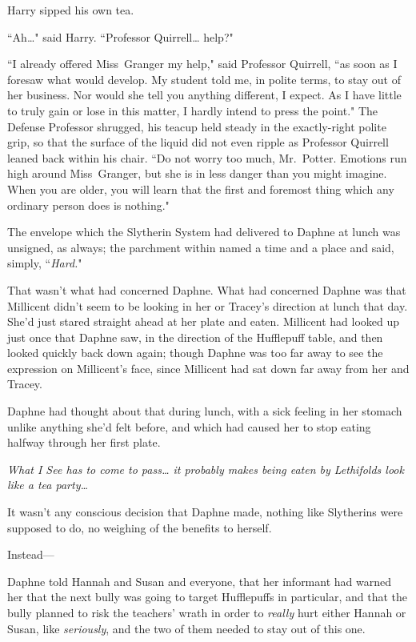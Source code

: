 Harry sipped his own tea.

``Ah{\ldots}" said Harry. ``Professor Quirrell{\ldots} help?"

``I already offered Miss~Granger my help," said Professor Quirrell, ``as soon as I foresaw what would develop. My student told me, in polite terms, to stay out of her business. Nor would she tell you anything different, I expect. As I have little to truly gain or lose in this matter, I hardly intend to press the point." The Defense Professor shrugged, his teacup held steady in the exactly-right polite grip, so that the surface of the liquid did not even ripple as Professor Quirrell leaned back within his chair. ``Do not worry too much, Mr.~Potter. Emotions run high around Miss~Granger, but she is in less danger than you might imagine. When you are older, you will learn that the first and foremost thing which any ordinary person does is nothing."

\later

The envelope which the Slytherin System had delivered to Daphne at lunch was unsigned, as always; the parchment within named a time and a place and said, simply, ``\emph{Hard.}"

That wasn't what had concerned Daphne. What had concerned Daphne was that Millicent didn't seem to be looking in her or Tracey's direction at lunch that day. She'd just stared straight ahead at her plate and eaten. Millicent had looked up just once that Daphne saw, in the direction of the Hufflepuff table, and then looked quickly back down again; though Daphne was too far away to see the expression on Millicent's face, since Millicent had sat down far away from her and Tracey.

Daphne had thought about that during lunch, with a sick feeling in her stomach unlike anything she'd felt before, and which had caused her to stop eating halfway through her first plate.

\emph{What I See has to come to pass{\ldots} it probably makes being eaten by Lethifolds look like a tea party{\ldots}}

It wasn't any conscious decision that Daphne made, nothing like Slytherins were supposed to do, no weighing of the benefits to herself.

Instead—

Daphne told Hannah and Susan and everyone, that her informant had warned her that the next bully was going to target Hufflepuffs in particular, and that the bully planned to risk the teachers' wrath in order to \emph{really} hurt either Hannah or Susan, like \emph{seriously}, and the two of them needed to stay out of this one.

